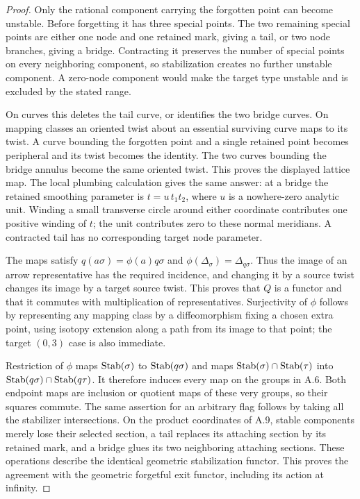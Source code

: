 \begin{proof}
Only the rational component carrying the forgotten point can become unstable. Before forgetting it has three special points. The two remaining special points are either one node and one retained mark, giving a tail, or two node branches, giving a bridge. Contracting it preserves the number of special points on every neighboring component, so stabilization creates no further unstable component. A zero-node component would make the target type unstable and is excluded by the stated range.

On curves this deletes the tail curve, or identifies the two bridge curves. On mapping classes an oriented twist about an essential surviving curve maps to its twist. A curve bounding the forgotten point and a single retained point becomes peripheral and its twist becomes the identity. The two curves bounding the bridge annulus become the same oriented twist. This proves the displayed lattice map. The local plumbing calculation gives the same answer: at a bridge the retained smoothing parameter is $t=u\,t_1t_2$, where $u$ is a nowhere-zero analytic unit. Winding a small transverse circle around either coordinate contributes one positive winding of $t$; the unit contributes zero to these normal meridians. A contracted tail has no corresponding target node parameter.

The maps satisfy $q(a\sigma)=\phi(a)q\sigma$ and $\phi(\Delta_\sigma)=\Delta_{q\sigma}$. Thus the image of an arrow representative has the required incidence, and changing it by a source twist changes its image by a target source twist. This proves that $Q$ is a functor and that it commutes with multiplication of representatives. Surjectivity of $\phi$ follows by representing any mapping class by a diffeomorphism fixing a chosen extra point, using isotopy extension along a path from its image to that point; the target $(0,3)$ case is also immediate.

Restriction of $\phi$ maps $\operatorname{Stab}(\sigma)$ to $\operatorname{Stab}(q\sigma)$ and maps $\operatorname{Stab}(\sigma)\cap\operatorname{Stab}(\tau)$ into $\operatorname{Stab}(q\sigma)\cap\operatorname{Stab}(q\tau)$. It therefore induces every map on the groups in A.6. Both endpoint maps are inclusion or quotient maps of these very groups, so their squares commute. The same assertion for an arbitrary flag follows by taking all the stabilizer intersections. On the product coordinates of A.9, stable components merely lose their selected section, a tail replaces its attaching section by its retained mark, and a bridge glues its two neighboring attaching sections. These operations describe the identical geometric stabilization functor. This proves the agreement with the geometric forgetful exit functor, including its action at infinity.
\end{proof}

